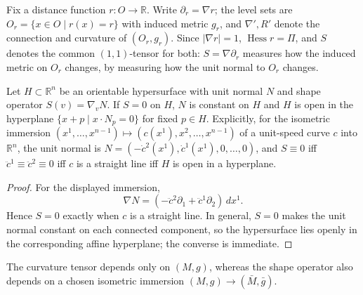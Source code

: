 \begin{definition}
  \label{def:pet-ch3-distance-function-notation}
  \leanok
  Fix a distance function $r:O\to\mathbb R$. Write $\partial_r=\nabla r$; the
  level sets are $O_r=\{x\in O\mid r(x)=r\}$ with induced metric $g_r$, and
  $\nabla',R'$ denote the connection and curvature of $(O_r,g_r)$. Since
  $|\nabla r|=1$, $\operatorname{Hess}r=\Pi$, and $S$ denotes the common
  $(1,1)$-tensor for both: $S=\nabla\partial_r$ measures how the induced metric
  on $O_r$ changes, by measuring how the unit normal to $O_r$ changes.
\end{definition}

\begin{example}
  \label{ex:pet-ch3-zero-shape-operator-hyperplane}
  \leanok
  Let $H\subset\mathbb R^n$ be an orientable hypersurface with unit normal $N$
  and shape operator $S(v)=\nabla_vN$. If $S=0$ on $H$, $N$ is constant on $H$
  and $H$ is open in the hyperplane $\{x+p\mid x\cdot N_p=0\}$ for fixed $p\in
  H$. Explicitly, for the isometric immersion
  $(x^1,\dots,x^{n-1})\mapsto(c(x^1),x^2,\dots,x^{n-1})$ of a unit-speed curve $c$
  into $\mathbb R^n$, the unit normal is $N=(-\dot c^2(x^1),\dot c^1(x^1),0,\dots,0)$,
  and $S\equiv0$ iff $\ddot c^1\equiv\ddot c^2\equiv0$ iff $c$ is a straight line
  iff $H$ is open in a hyperplane.
\end{example}
\begin{proof}
  \sketch
  For the displayed immersion,
  \[
   \nabla N=(-\ddot c^2\partial_1+\ddot c^1\partial_2)\,dx^1.
  \]
  Hence $S=0$ exactly when $c$ is a straight line. In general, $S=0$ makes the
  unit normal constant on each connected component, so the hypersurface lies
  openly in the corresponding affine hyperplane; the converse is immediate.
\end{proof}

\begin{remark}
  \label{rem:pet-ch3-intrinsic-extrinsic}
  \leanok
  The curvature tensor depends only on $(M,g)$, whereas the shape operator also
  depends on a chosen isometric immersion
  $(M,g)\to(\bar M,\bar g)$.
\end{remark}

